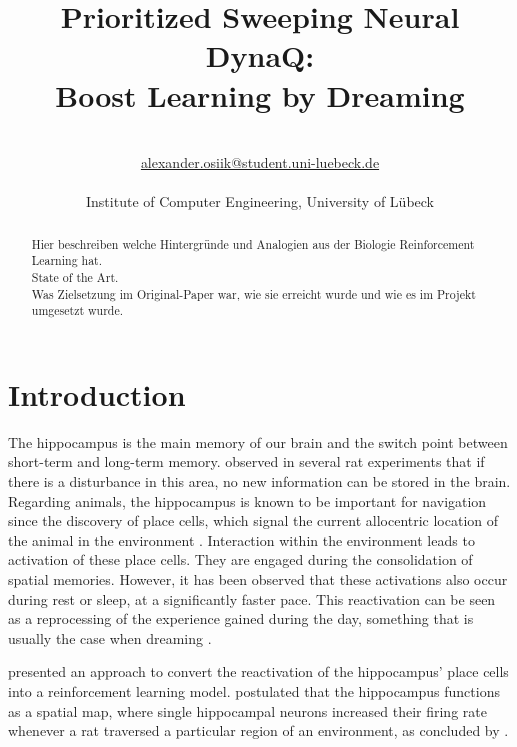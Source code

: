 \documentclass[a4paper]{article}
\title{\textbf{Prioritized Sweeping Neural DynaQ:\\ Boost Learning by Dreaming}}\let\Title\@title
\author{\AuthorName\\
	\href{mailto:alexander.osiik@student.uni-luebeck.de}{alexander.osiik@student.uni-luebeck.de}\\
	\small \seminar\\
	\small Institute of Computer Engineering, University of L\"ubeck\\
}\let\Author\@author
\begin{document}
	\maketitle
	
	\begin{abstract}
		\noindent%
		Hier beschreiben welche Hintergründe und Analogien aus der Biologie Reinforcement Learning hat.\\
		State of the Art.\\
		Was Zielsetzung im Original-Paper war, wie sie erreicht wurde und wie es im Projekt umgesetzt wurde.
	\end{abstract}
	
	
	\section{Introduction}
	\label{sec:introduction}
	\par The hippocampus is the main memory of our brain and the switch point between short-term and long-term memory. \citet{OKEEFE1971171} observed in several rat experiments that if there is a disturbance in this area, no new information can be stored in the brain. Regarding animals, the hippocampus is known to be important for navigation since the discovery of place cells, which signal the current allocentric location of the animal in the environment \citep{Maguire}. Interaction within the environment leads to activation of these place cells. They are engaged during the consolidation of spatial memories. However, it has been observed that these activations also occur during rest or sleep, at a significantly faster pace. This reactivation can be seen as a reprocessing of the experience gained during the day, something that is usually the case when dreaming \citep{HippocampalReplaysGirard}.
	
	\par \citet{NeuralDynaQ} presented an approach to convert the reactivation of the hippocampus' place cells into a reinforcement learning model.  \cite{OKEEFE1971171} postulated that the hippocampus functions as a spatial map, where single hippocampal neurons increased their firing rate whenever a rat traversed a particular region of an environment, as concluded by \cite{Nakazawa}.
	
\end{document}
